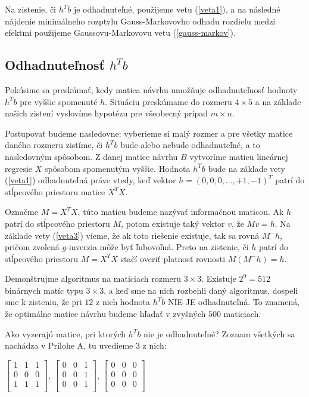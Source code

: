 Na zistenie, či $h^T b$ je odhadnuteľné, použijeme vetu (\ref{veta1}), 
a na následné nájdenie minimálneho rozptylu Gauss-Markovovho odhadu rozdielu medzi efektmi 
použijeme Gaussovu-Markovovu vetu (\ref{gauss-markov}).

\subsection{Odhadnuteľnosť $h^T b$}

Pokúsime sa preskúmať, kedy matica návrhu umožňuje odhadnuteľnosť hodnoty $h^T b$ pre vyššie spomenuté $h$. 
Situáciu preskúmame do rozmeru $4 \times 5$ a na základe našich zistení vyslovíme hypotézu pre všeobecný prípad $m \times n$.

Postupovať budeme nasledovne: vyberieme si malý rozmer a pre všetky matice daného rozmeru zistíme, 
či $h^T b$ bude alebo nebude odhadnuteľné, a to nasledovným spôsobom. 
Z danej matice návrhu $B$ vytvoríme maticu lineárnej regresie $X$ spôsobom spomenutým vyššie. 
Hodnota $h^T b$ bude na základe vety (\ref{veta1}) odhadnuteľná práve vtedy, 
keď vektor $h = (0, 0, 0, \ldots, +1, -1)^T$ patrí do stĺpcového priestoru matice $X^T X$.

Označme $M = X^T X$, túto maticu budeme nazývať informačnou maticou. 
Ak $h$ patrí do stĺpcového priestoru $M$, potom existuje taký vektor $v$, že $M v = h$. 
Na základe vety (\ref{veta3}) vieme, že ak toto riešenie existuje, tak sa rovná $M^- h$, pričom zvolená $g$-inverzia môže byť ľubovoľná.
Preto na zistenie, či $h$ patrí do stĺpcového priestoru $M = X^T X$ stačí overiť platnosť rovnosti $M(M^- h) = h$. 

Demonštrujme algoritmus na maticiach rozmeru $3 \times 3$. Existuje $2^9 = 512$ binárnych matíc typu $3 \times 3$, 
a keď sme na nich rozbehli daný algoritmus, dospeli sme k zisteniu, že pri $12$ z nich hodnota $h^T b$ NIE JE odhadnuteľná.
To znamená, že optimálne matice návrhu budeme hľadať v zvyšných $500$ maticiach.

Ako vyzerajú matice, pri ktorých $h^T b$ nie je odhadnuteľné? Zoznam všetkých sa nachádza v Prílohe A, tu uvedieme $3$ z nich:

\begin{center}
$
\begin{bmatrix}
1 & 1 & 1 \\
0 & 0 & 0 \\
1 & 1 & 1 \\
\end{bmatrix}
$, 
$
\begin{bmatrix}
0 & 0 & 1 \\
0 & 0 & 1 \\
0 & 0 & 1 \\
\end{bmatrix}
$, 
$
\begin{bmatrix}
0 & 0 & 0 \\
0 & 0 & 0 \\
0 & 0 & 0 \\
\end{bmatrix}
$
\end{center}

